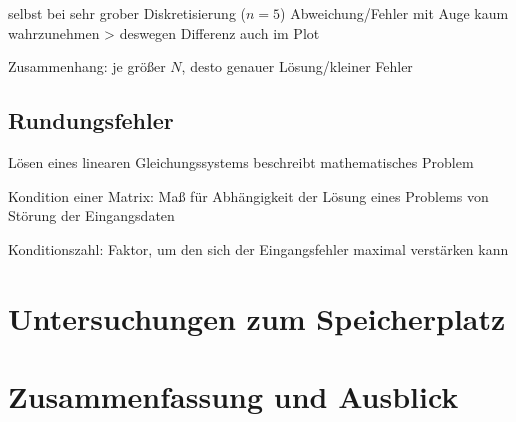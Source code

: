 \documentclass{scrartcl}
\begin{document}
selbst bei sehr grober Diskretisierung ($n=5$) Abweichung/Fehler mit Auge kaum wahrzunehmen > deswegen Differenz auch im Plot

Zusammenhang: je größer $N$, desto genauer Lösung/kleiner Fehler

\subsection{Rundungsfehler}
Lösen eines linearen Gleichungssystems beschreibt mathematisches Problem

Kondition einer Matrix: Maß für Abhängigkeit der Lösung eines Problems von Störung der Eingangsdaten

Konditionszahl: Faktor, um den sich der Eingangsfehler maximal verstärken kann 

\pagebreak
\section{Untersuchungen zum Speicherplatz}


\pagebreak
\section{Zusammenfassung und Ausblick}


\pagebreak



\end{document}
